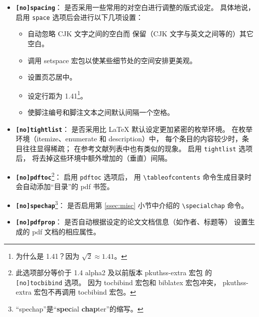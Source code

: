 		\begin{itemize}
			\item \textbf{\texttt{[no]spacing}}：
				是否采用一些常用的对空白进行调整的版式设定。
				具体地说，启用 \verb|space| 选项后会进行以下几项设置：
			\begin{itemize}
				\item 自动忽略 CJK 文字之间的空白而%
					保留（CJK 文字与英文之间等的）其它空白。
				\item 调用 setspace 宏包以使某些细节处的空间安排更美观。
				\item 设置页芯居中。
				\item 设定行距为 1.41\footnote{%
					为什么是 1.41？因为 $\sqrt{2}\approx1.41$。%
				}。
				\item 使脚注编号和脚注文本之间默认间隔一个空格。
			\end{itemize}

			\item \textbf{\texttt{[no]tightlist}}：
				是否采用比 \LaTeX{} 默认设定更加紧密的枚举环境。
				在枚举环境（itemize、enumerate 和 description）中，
				每个条目的内容较少时，条目往往显得稀疏；
				在参考文献列表中也有类似的现象。
				启用 \verb|tightlist| 选项后，
				将去掉这些环境中额外增加的（垂直）间隔。

			\item \textbf{\texttt{[no]pdftoc}}\footnote{%
					此选项部分等价于 1.4 alpha2 及以前版本 pkuthss-extra 宏包%
					的 \texttt{[no]tocbibind} 选项。
					因为 tocbibind 宏包和 biblatex 宏包冲突，
					pkuthss-extra 宏包不再调用 tocbibind 宏包。%
				}：
				启用 \verb|pdftoc| 选项后，
				用 \verb|\tableofcontents| 命令生成目录时%
				会自动添加“目录”的 pdf 书签。

			\item \textbf{\texttt{[no]spechap}}\footnote{%
					“spechap”是“\textbf{spec}ial \textbf{chap}ter”的缩写。%
				}：
				是否启用第 \ref{ssec:misc} 小节中介绍的 %
				\verb|\specialchap| 命令。

			\item \textbf{\texttt{[no]pdfprop}}：
				是否自动根据设定的论文文档信息（如作者、标题等）
				设置生成的 pdf 文档的相应属性。%


\end{itemize}
